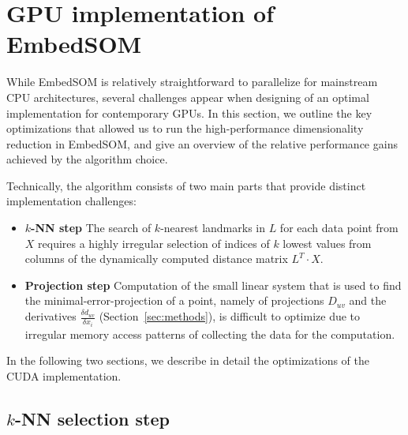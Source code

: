 \section{GPU implementation of EmbedSOM}\label{sec:impl}

While EmbedSOM is relatively straightforward to parallelize for mainstream CPU architectures, several challenges appear when designing of an optimal implementation for contemporary GPUs.
In this section, we outline the key optimizations that allowed us to run the high-performance dimensionality reduction in EmbedSOM, and give an overview of the relative performance gains achieved by the algorithm choice.

Technically, the algorithm consists of two main parts that provide distinct implementation challenges:

\begin{itemize}
\item {\bfseries $k$-NN step}\quad
The search of $k$-nearest landmarks in $L$ for each data point from $X$ requires a highly irregular selection of indices of $k$ lowest values from columns of the dynamically computed distance matrix $L^T\cdot X$.

\item {\bfseries Projection step}\quad
Computation of the small linear system that is used to find the minimal-error-projection of a point, namely of projections $D_{uv}$ and the derivatives $\frac{\delta d_{uv}}{\delta x_i}$ (Section~\ref{sec:methods}), is difficult to optimize due to irregular memory access patterns of collecting the data for the computation.
\end{itemize}


In the following two sections, we describe in detail the optimizations of the CUDA implementation.

\subsection{$k$-NN selection step}\label{sec:impl-knn}

